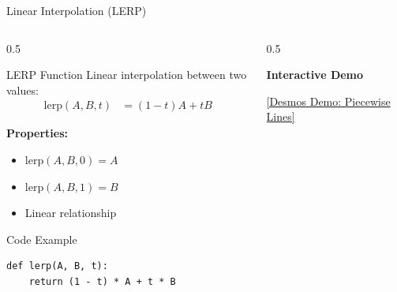 \begin{frame}[fragile]{Linear Interpolation (LERP)}
  \begin{columns}
    \begin{column}{0.5\textwidth}
      \begin{mathbox}{LERP Function}
        \small
        Linear interpolation between two values:
        \begin{align*}
          \text{lerp}(A, B, t) &= (1-t)A + tB
        \end{align*}

        \textbf{Properties:}
        \begin{itemize}
            \scriptsize
          \item $\text{lerp}(A, B, 0) = A$
          \item $\text{lerp}(A, B, 1) = B$
          \item Linear relationship
        \end{itemize}
      \end{mathbox}

      \begin{conceptbox}{Code Example}
        \scriptsize
        \begin{verbatim}
def lerp(A, B, t):
    return (1 - t) * A + t * B
        \end{verbatim}
      \end{conceptbox}
    \end{column}
    \begin{column}{0.5\textwidth}
      \begin{center}
        \textbf{Interactive Demo}

        \textcolor{AccentColor}{\href{https://www.desmos.com/calculator/nq6achjftb}{[Desmos Demo: Piecewise Lines]}}

        \vspace{0.5cm}

      \end{center}
    \end{column}
  \end{columns}
\end{frame}
